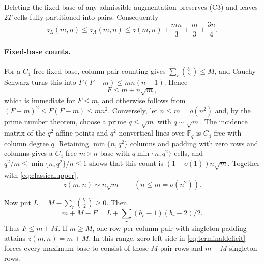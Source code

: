 \documentclass[11pt]{article}
\newcommand{\za}{z_A}
\newcommand{\zl}{z_L}
\begin{document}
Deleting the fixed base of any admissible augmentation preserves
\textup{(C3)} and leaves $2T$ cells fully partitioned into pairs.
Consequently
\begin{equation}\label{eq:generaloriginalupper}
 \zl(m,n)\le\za(m,n)
 \le z(m,n)+\frac{mn}{3}+\frac m3+\frac{3n}{4}.
\end{equation}

\paragraph{Fixed-base counts.}
For a $C_4$-free fixed base, column-pair counting gives
$\sum_r\binom{b_r}{2}\le M$, and Cauchy--Schwarz turns this into
$F(F-m)\le mn(n-1)$. Hence
\begin{equation}\label{eq:classicalupper}
 F\le m+n\sqrt m,
\end{equation}
which is immediate for $F\le m$, and otherwise follows from
$(F-m)^2\le F(F-m)\le mn^2$. Conversely, let $n\le m=o(n^2)$ and, by the
prime number theorem, choose a prime $q\le\sqrt m$ with $q\sim\sqrt m$.
The incidence matrix of the $q^2$ affine points and $q^2$ nonvertical
lines over $\mathbb F_q$ is $C_4$-free with column degree $q$. Retaining
$\min\{n,q^2\}$ columns and padding with zero rows and columns gives a
$C_4$-free $m\times n$ base with $q\min\{n,q^2\}$ cells, and
$q^2/m\le\min\{n,q^2\}/n\le1$ shows that this count is
$(1-o(1))n\sqrt m$. Together with \eqref{eq:classicalupper},
\begin{equation}\label{eq:classicalasymptotic}
 z(m,n)\sim n\sqrt m\qquad(n\le m=o(n^2)).
\end{equation}

Now put $L=M-\sum_r\binom{b_r}{2}\ge0$.
Then
\begin{equation}\label{eq:terminaldeficit}
 m+M-F=L+\sum_r(b_r-1)(b_r-2)/2.
\end{equation}
Thus $F\le m+M$. If $m\ge M$, one row per column pair with singleton
padding attains $z(m,n)=m+M$. In this range, zero left side in
\eqref{eq:terminaldeficit} forces every maximum base to consist of
those $M$ pair rows and $m-M$ singleton rows.
\end{document}
